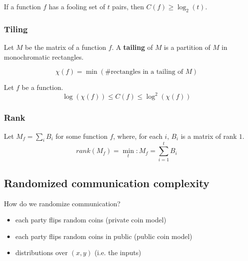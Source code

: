         \begin{theorem}\label{thm:fool_set}
            If a function $f$ has a fooling set of $t$ pairs, then $C(f) \geq \log_2(t)$.
        \end{theorem}


    \subsubsection{Tiling}\label{subsubsec:tiling}
        
        \begin{definition}[Tailing]\label{def:tailing}
            Let $M$ be the matrix of a function $f$.
            A \textbf{tailing} of $M$ is a partition of $M$ in monochromatic rectangles.

            \[ \chi(f) = \min(\text{\# rectangles in a tailing of } M) \]
        \end{definition}

        \begin{theorem}\label{thm:tailing_chi}
            Let $f$ be a function.
            \[ \log(\chi(f)) \leq C(f) \leq \log^2(\chi(f)) \]
        \end{theorem}

    \subsubsection{Rank}\label{subsubsec:rank}

        \begin{definition}[Rank]\label{def:rank}
            Let $M_f = \sum_i B_i$ for some function $f$, where, for each $i$, $B_i$ is a matrix of rank $1$.
            \[ rank(M_f) = \min_t : M_f = \sum_{i = 1}^t B_i \]
        \end{definition}


\subsection{Randomized communication complexity}\label{subsec:rand_comm_compl}
    
    How do we randomize communication?
    \begin{itemize}
        \item each party flips random coins (private coin model)
        \item each party flips random coins in public (public coin model)
        \item distributions over $(x,y)$ (i.e. the inputs)
    \end{itemize}

